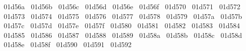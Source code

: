 {  ^^^^^^01d56a%
  ^^^^^^01d56b%
  ^^^^^^01d56c%
  ^^^^^^01d56d%
  ^^^^^^01d56e%
  ^^^^^^01d56f%
  ^^^^^^01d570%
  ^^^^^^01d571%
  ^^^^^^01d572%
  ^^^^^^01d573%
  ^^^^^^01d574%
  ^^^^^^01d575%
  ^^^^^^01d576%
  ^^^^^^01d577%
  ^^^^^^01d578%
  ^^^^^^01d579%
  ^^^^^^01d57a%
  ^^^^^^01d57b%
  ^^^^^^01d57c%
  ^^^^^^01d57d%
  ^^^^^^01d57e%
  ^^^^^^01d57f%
  ^^^^^^01d580%
  ^^^^^^01d581%
  ^^^^^^01d582%
  ^^^^^^01d583%
  ^^^^^^01d584%
  ^^^^^^01d585%
  ^^^^^^01d586%
  ^^^^^^01d587%
  ^^^^^^01d588%
  ^^^^^^01d589%
  ^^^^^^01d58a%
  ^^^^^^01d58b%
  ^^^^^^01d58c%
  ^^^^^^01d58d%
  ^^^^^^01d58e%
  ^^^^^^01d58f%
  ^^^^^^01d590%
  ^^^^^^01d591%
  ^^^^^^01d592%
}
